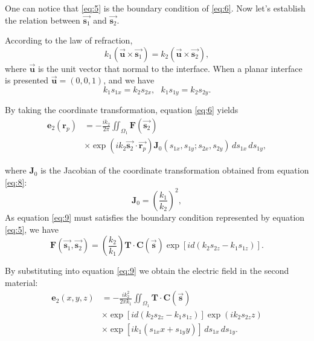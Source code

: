\documentclass[9pt,twocolumn,twoside]{osajnl}
\begin{document}
One can notice that \eqref{eq:5} is the boundary condition of \eqref{eq:6}. Now let's establish the relation between $\vec{\textbf{s}_1}$ and $\vec{\textbf{s}_2}$.

According to the law of refraction,
\begin{equation}\label{eq:7}
	k_1(\vec{\textbf{u}}\times\vec{\textbf{s}_1})=k_2(\vec{\textbf{u}}\times\vec{\textbf{s}_2}),
\end{equation}
where $\vec{\textbf{u}}$ is the unit vector that normal to the interface. When a planar interface is presented $\vec{\textbf{u}}=(0,0,1)$, and we have
\begin{equation}\label{eq:8}
	k_1s_{1x}=k_2s_{2x},\,\,\,\,
	k_1s_{1y}=k_2s_{2y}.
\end{equation} 

By taking the coordinate transformation, equation \eqref{eq:6} yields
\begin{equation}\label{eq:9}
	\begin{aligned}
		\mathbf{e}_2(\mathbf{r}_p)&=-\frac{ik_2}{2\pi}\iint_{\Omega_1}\mathbf{F}(\vec{\mathbf{s}_2})\\
		&\times\exp(ik_2\vec{\mathbf{s}_2}\cdot\vec{\mathbf{r}_p})\mathbf{J}_0(s_{1x},s_{1y};s_{2x},s_{2y})\,ds_{1x}\,ds_{1y},		
	\end{aligned}
\end{equation}

where $\mathbf{J}_0$ is the Jacobian of the coordinate transformation obtained from equation \eqref{eq:8}:
\begin{equation}\label{eq:10}
	\mathbf{J}_0=(\frac{k_1}{k_2})^2,
\end{equation}
As equation \eqref{eq:9} must satisfies the boundary condition represented by equation \eqref{eq:5}, we have
\begin{equation}\label{eq:11}
	\mathbf{F}(\vec{\mathbf{s}_1},\vec{\mathbf{s}_2})=(\frac{k_2}{k_1})\mathbf{T}\cdot\mathbf{C}(\vec{\mathbf{s}})\exp[id(k_2s_{2z}-k_1s_{1z})].
\end{equation}

By substituting into equation \eqref{eq:9} we obtain the electric field in the second material:
\begin{equation}
	\begin{aligned}\label{eq:12}
	\mathbf{e}_2(x,y,z)&=-\frac{ik^2_2}{2\pi k_1}\iint_{\Omega_1}\mathbf{T}\cdot\mathbf{C}(\vec{\mathbf{s}})\\
	&\times\exp[id(k_2s_{2z}-k_1s_{1z})]\exp(ik_2s_{2z}z)\\
	&\times\exp[ik_1(s_{1x}x+s_{1y}y)]\,ds_{1x}\,ds_{1y}.
	\end{aligned}
\end{equation}
\end{document}
